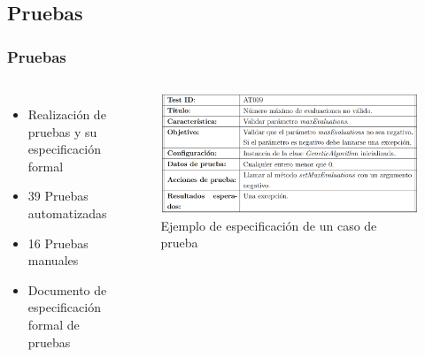 \documentclass[9pt]{beamer}
\begin{document}
    \subsection{Pruebas}
    \begin{frame}
        \frametitle{Pruebas}                       
        
        \begin{columns}
            \begin{itemize}
                \item Realización de pruebas y su especificación formal
                \item 39 Pruebas automatizadas
                \item 16 Pruebas manuales
                \item Documento de especificación formal de pruebas
            \end{itemize}

            \begin{figure}
                \includegraphics[width=\textwidth]{assets/PruebaAutomatizada.png}
                \caption{Ejemplo de especificación de un caso de prueba}
            \end{figure}
        \end{columns}

    \end{frame}

        
\end{document}
